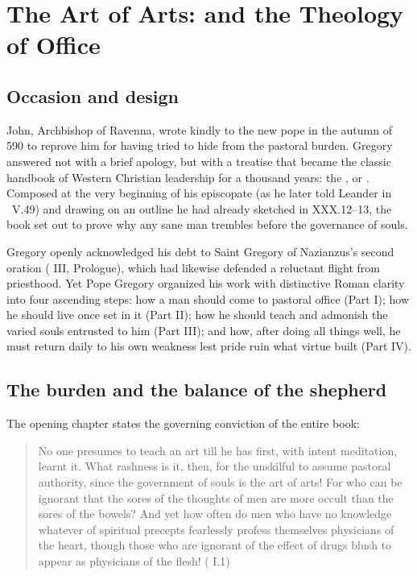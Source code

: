 \section{The Art of Arts:  and the Theology of Office}

\subsection{Occasion and design}

John, Archbishop of Ravenna, wrote kindly to the new pope in the autumn of 590
to reprove him for having tried to hide from the pastoral burden. Gregory
answered not with a brief apology, but with a treatise that became the classic
handbook of Western Christian leadership for a thousand years: the , or . Composed at the very
beginning of his episcopate (as he later told Leander in \ V.49) and
drawing on an outline he had already sketched in 
XXX.12--13, the book set out to prove why any sane man trembles before the
governance of souls.

Gregory openly acknowledged his debt to Saint Gregory of Nazianzus's second
oration ( III, Prologue), which had likewise defended a
reluctant flight from priesthood. Yet Pope Gregory organized his work with
distinctive Roman clarity into four ascending steps: how a man should come to
pastoral office (Part I); how he should live once set in it (Part II); how he
should teach and admonish the varied souls entrusted to him (Part III); and
how, after doing all things well, he must return daily to his own weakness lest
pride ruin what virtue built (Part IV).

\subsection{The burden and the balance of the shepherd}

The opening chapter states the governing conviction of the entire book:

\begin{quote}
No one presumes to teach an art till he has first, with intent meditation,
learnt it. What rashness is it, then, for the unskilful to assume pastoral
authority, since the government of souls is the art of arts! For who can be
ignorant that the sores of the thoughts of men are more occult than the sores
of the bowels? And yet how often do men who have no knowledge whatever of
spiritual precepts fearlessly profess themselves physicians of the heart,
though those who are ignorant of the effect of drugs blush to appear as
physicians of the flesh! ( I.1)
\end{quote}

